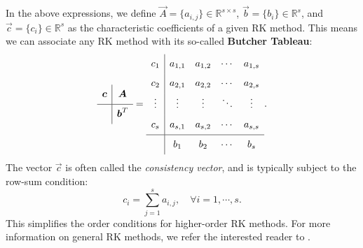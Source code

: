 \documentclass{article}
\begin{document}
In the above expressions, we define $\vec{A} = \lbrace a_{i,j} \rbrace \in \mathbb{R}^{s\times s}$,
$\vec{b} = \lbrace b_i \rbrace \in \mathbb{R}^s$, and
$\vec{c} = \lbrace c_i \rbrace \in \mathbb{R}^s$ as the characteristic coefficients of
a given RK method. This means we can associate any RK method with its so-called \textbf{Butcher Tableau}:
\begin{equation}\label{eq:gen-bt}
\begin{array}{c|c}
\ST \vec{c} &\vec{A}\\
\hline
\ST  & \vec{b}^T
\end{array} =
\begin{array}{c|c c c c}
\ST c_1 & a_{1,1} & a_{1,2} & \cdots & a_{1,s}\\
\ST c_2 & a_{2,1} & a_{2,2} & \cdots & a_{2,s}\\
\ST \vdots & \vdots & \vdots & \ddots & \vdots \\
\ST c_s & a_{s,1} & a_{s,2} & \cdots & a_{s,s}\\
\hline
\ST  & b_1 & b_2 & \cdots & b_s
\end{array}.
\end{equation}
The vector $\vec{c}$ is often called the \emph{consistency vector}, and is typically subject
to the row-sum condition:
\begin{equation}
c_i = \sum_{j=1}^{s} a_{i,j}, \quad \forall i = 1, \cdots, s.
\end{equation}
This simplifies the order conditions for higher-order RK methods. For more information
on general RK methods, we refer the interested reader to \cite[Ch. 5.2]{atkinson2011numerical}.
\end{document}
